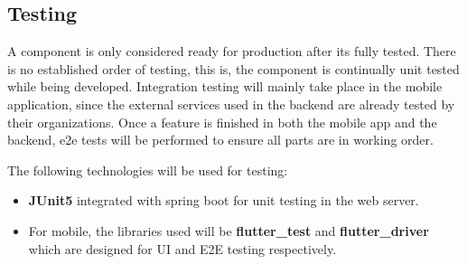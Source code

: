 \subsection{Testing}
A component is only considered ready for production after its fully tested. There is no established order of testing, this is, the component is continually unit tested while being developed. 
Integration testing will mainly take place in the mobile application, since the external services used in the backend are already tested by their organizations. 
Once a feature is finished in both the mobile app and the backend, e2e tests will be performed to ensure all parts are in working order.

The following technologies will be used for testing:
\begin{itemize}
    \item 
    \textbf{JUnit5} integrated with spring boot for unit testing in the web server.
    \item 
    For mobile, the libraries used will be \textbf{flutter\_test} and \textbf{flutter\_driver} which are designed for UI and E2E testing respectively.
\end{itemize}